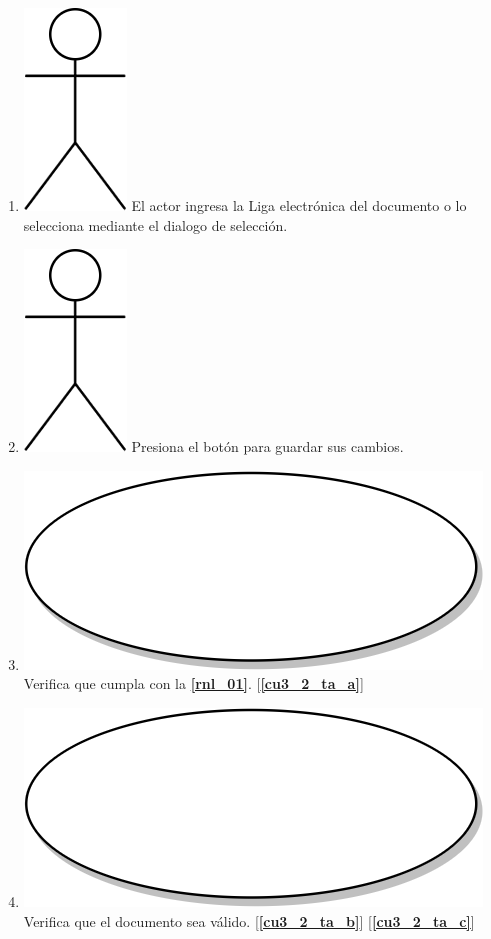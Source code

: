 \begin{enumerate}
\item {\includegraphics[scale=.1]{Capitulo3/img/actor.png} El actor ingresa la Liga electrónica del documento o lo selecciona mediante el dialogo de selección.}
  \item {\includegraphics[scale=.1]{Capitulo3/img/actor.png} Presiona el botón para guardar sus cambios.}
  \item {\includegraphics[scale=.05]{Capitulo3/img/proceso.png} Verifica que cumpla con la \textbf{\ref{rnl_01}}. [\textbf{\ref{cu3_2_ta_a}}]}
  \item {\includegraphics[scale=.05]{Capitulo3/img/proceso.png} Verifica que el documento sea válido. [\textbf{\ref{cu3_2_ta_b}}] [\textbf{\ref{cu3_2_ta_c}}]}

\end{enumerate}
